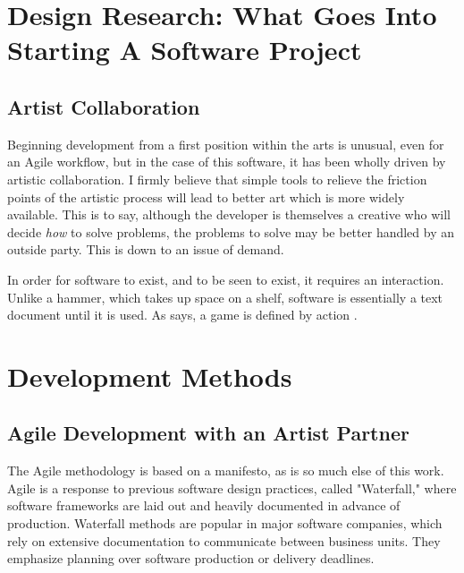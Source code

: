 \section{Design Research: What Goes Into Starting A Software Project}

\subsection{Artist Collaboration}

Beginning development from a first position within the arts is unusual, even for an Agile workflow, but in the case of this software, it has been wholly driven by artistic collaboration. I firmly believe that simple tools to relieve the friction points of the artistic process will lead to better art which is more widely available. This is to say, although the developer is themselves a creative who will decide \textit{how} to solve problems, the problems to solve may be better handled by an outside party. This is down to an issue of demand. 

In order for software to exist, and to be seen to exist, it requires an interaction. Unlike a hammer, which takes up space on a shelf, software is essentially a text document until it is used. As says, a game is defined by action . \parencite{galloway}


\section{Development Methods}
\subsection{Agile Development with an Artist Partner}
The Agile methodology is based on a manifesto, as is so much else of this work. Agile is a response to previous software design practices, called "Waterfall," where software frameworks are laid out and heavily documented in advance of production. Waterfall methods are popular in major software companies, which rely on extensive documentation to communicate between business units. They emphasize planning over software production or delivery deadlines. 

